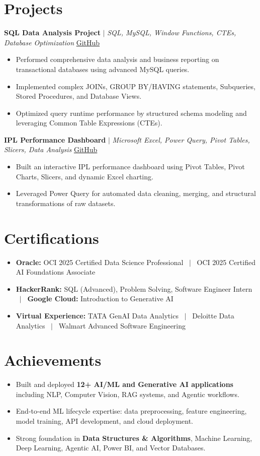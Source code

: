 \documentclass[a4paper,9pt]{article}
\newcommand{\resumeItem}[1]{\item\small #1}
\begin{document}
\vspace{-2mm}

\section{Projects}

\noindent\textbf{SQL Data Analysis Project} $|$ \textit{SQL, MySQL, Window Functions, CTEs, Database Optimization} \hfill
\href{https://github.com/hsachan295-source/smart-business-dashboard}{\small GitHub}
\begin{itemize}
\resumeItem{Performed comprehensive data analysis and business reporting on transactional databases using advanced MySQL queries.}
\resumeItem{Implemented complex JOINs, GROUP BY/HAVING statements, Subqueries, Stored Procedures, and Database Views.}
\resumeItem{Optimized query runtime performance by structured schema modeling and leveraging Common Table Expressions (CTEs).}
\end{itemize}

\vspace{1.5pt}
\noindent\textbf{IPL Performance Dashboard} $|$ \textit{Microsoft Excel, Power Query, Pivot Tables, Slicers, Data Analysis} \hfill
\href{https://github.com/hsachan295-source/Power-BI-Portfolio}{\small GitHub}
\begin{itemize}
\resumeItem{Built an interactive IPL performance dashboard using Pivot Tables, Pivot Charts, Slicers, and dynamic Excel charting.}
\resumeItem{Leveraged Power Query for automated data cleaning, merging, and structural transformations of raw datasets.}
\end{itemize}


\vspace{-2mm}

\section{Certifications}
\begin{itemize}
\resumeItem{\textbf{Oracle:} OCI 2025 Certified Data Science Professional ~$|$~ OCI 2025 Certified AI Foundations Associate}
\resumeItem{\textbf{HackerRank:} SQL (Advanced), Problem Solving, Software Engineer Intern ~$|$~ \textbf{Google Cloud:} Introduction to Generative AI}
\resumeItem{\textbf{Virtual Experience:} TATA GenAI Data Analytics ~$|$~ Deloitte Data Analytics ~$|$~ Walmart Advanced Software Engineering}
\end{itemize}

\vspace{-2mm}

\section{Achievements}
\begin{itemize}
\resumeItem{Built and deployed \textbf{12+ AI/ML and Generative AI applications} including NLP, Computer Vision, RAG systems, and Agentic workflows.}
\resumeItem{End-to-end ML lifecycle expertise: data preprocessing, feature engineering, model training, API development, and cloud deployment.}
\resumeItem{Strong foundation in \textbf{Data Structures \& Algorithms}, Machine Learning, Deep Learning, Agentic AI, Power BI, and Vector Databases.}
\end{itemize}
\end{document}
